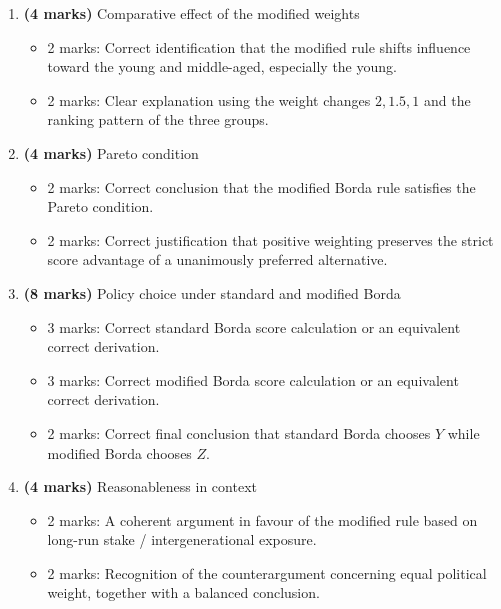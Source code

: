 \documentclass[12pt]{article}
\begin{document}
\begin{enumerate}[label=(\alph*)]
    \item \textbf{(4 marks)} Comparative effect of the modified weights
    \begin{itemize}[leftmargin=*]
        \item 2 marks: Correct identification that the modified rule shifts influence toward the young and middle-aged, especially the young.
        \item 2 marks: Clear explanation using the weight changes \(2,1.5,1\) and the ranking pattern of the three groups.
    \end{itemize}

    \item \textbf{(4 marks)} Pareto condition
    \begin{itemize}[leftmargin=*]
        \item 2 marks: Correct conclusion that the modified Borda rule satisfies the Pareto condition.
        \item 2 marks: Correct justification that positive weighting preserves the strict score advantage of a unanimously preferred alternative.
    \end{itemize}

    \item \textbf{(8 marks)} Policy choice under standard and modified Borda
    \begin{itemize}[leftmargin=*]
        \item 3 marks: Correct standard Borda score calculation or an equivalent correct derivation.
        \item 3 marks: Correct modified Borda score calculation or an equivalent correct derivation.
        \item 2 marks: Correct final conclusion that standard Borda chooses \(Y\) while modified Borda chooses \(Z\).
    \end{itemize}

    \item \textbf{(4 marks)} Reasonableness in context
    \begin{itemize}[leftmargin=*]
        \item 2 marks: A coherent argument in favour of the modified rule based on long-run stake / intergenerational exposure.
        \item 2 marks: Recognition of the counterargument concerning equal political weight, together with a balanced conclusion.
    \end{itemize}
\end{enumerate}
\end{document}
